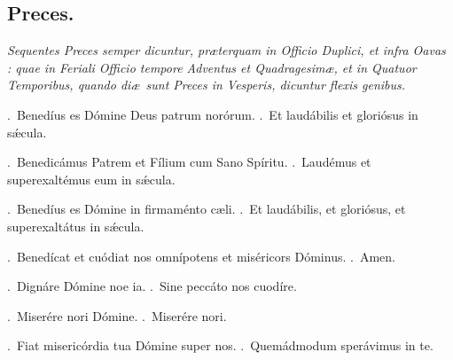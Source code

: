 \documentclass[12pt]{article} %
\def\noinitial{%
\gresetfirstlineaboveinitial{\textcolor{benred8}{\small \textsc{\textbf{}}}}{\textcolor{benred8}{\small \textsc{\textbf{}}}}
\setspaceafterinitial{0pt plus 0em minus 0em}%
\setspacebeforeinitial{0pt plus 0em minus 0em}%
\relax %
}
\newenvironment{rubric}{\vspace{1 mm}\color{benred8} \itshape \leftskip 0in \setlength{\parindent}{0.25in}}{\vspace{1 mm}}
\newenvironment{response}{\leftskip 0in \setlength{\parindent}{0in}}{\vspace{1 mm}}
\let\oldVbar\Vbar
\renewcommand{\Vbar}{\textcolor{benred8}{\oldVbar .}}
\let\oldRbar\Rbar
\renewcommand{\Rbar}{\textcolor{benred8}{\oldRbar .}}
\begin{document}
{\noinitial
{}

}

\newpage


\subsection*{Preces.}

\begin{rubric}
Sequentes Preces semper dicuntur, pr\ae terquam in Officio Duplici, et infra Oavas : quae in Feriali Officio tempore Adventus et Quadragesim\ae, et in Quatuor Temporibus, quando di\ae\ sunt Preces in Vesperis, dicuntur flexis genibus.

\end{rubric}

\gresetfirstlineaboveinitial{\small \textsc{ \textbf{\textcolor{benred8}{\Vbar}}}}{\small \textsc{ \textbf{\textcolor{benred8}{\Vbar}}}}

\vspace{2mm}

\gresetfirstlineaboveinitial{\small \textsc{ \textbf{\textcolor{benred8}{\Vbar}}}}{\small \textsc{ \textbf{\textcolor{benred8}{\Vbar}}}}

\vspace{2mm}

\gresetfirstlineaboveinitial{\small \textsc{ \textbf{\textcolor{benred8}{\Vbar}}}}{\small \textsc{ \textbf{\textcolor{benred8}{\Vbar}}}}

\begin{response}
\Vbar\ Bened\'{i}us es D\'{o}mine Deus patrum nor\'{o}rum.
\Rbar\ Et laud\'{a}bilis et glori\'{o}sus in s\'{\ae}cula.

\Vbar\ Benedic\'{a}mus Patrem et F\'{i}lium cum Sano Sp\'{i}ritu.
\Rbar\ Laud\'{e}mus et superexalt\'{e}mus eum in s\'{\ae}cula.

\Vbar\ Bened\'{i}us es D\'{o}mine in firmam\'{e}nto c\ae li.
\Rbar\ Et laud\'{a}bilis, et glori\'{o}sus, et superexalt\'{a}tus in s\'{\ae}cula.

\Vbar\ Bened\'{i}cat et cu\'{o}diat nos omn\'{i}potens et mis\'{e}ricors D\'{o}minus.
\Rbar\ Amen.

\Vbar\ Dign\'{a}re D\'{o}mine noe ia.
\Rbar\ Sine pecc\'{a}to nos cuod\'{i}re.

\Vbar\ Miser\'{e}re nori D\'{o}mine.
\Rbar\ Miser\'{e}re nori.

\Vbar\ Fiat miseric\'{o}rdia tua D\'{o}mine super nos. 
\Rbar\ Quem\'{a}dmodum sper\'{a}vimus in te.

\end{response}
\end{document}
